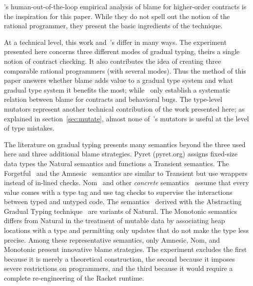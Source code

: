 
\citet{lksfd-popl-2020}'s human-out-of-the-loop empirical analysis of blame for
higher-order contracts is the inspiration for this paper.  While they do not
spell out the notion of the rational programmer, they present the basic
ingredients of the technique.

At a technical level, this work and~\citet{lksfd-popl-2020}'s differ in
many ways. The experiment presented here concerns three different modes of
gradual typing, theirs a single notion of contract checking.  It also
contributes the idea of creating three comparable rational programmers
(with several modes). Thus the method of this paper answers whether blame
adds value to a gradual type system and what gradual type system it
benefits the most; while~\citet{lksfd-popl-2020} only establish a
systematic relation between blame for contracts and behavioral bugs. The
type-level mutators represent another technical contribution of the work
presented here; as explained in section~\ref{sec:mutate}, almost none
of~\citet{lksfd-popl-2020}'s mutators is useful at the level of type
mistakes.

The literature on gradual typing presents many semantics beyond the three used
here and three additional blame strategies.  Pyret (pyret.org) assigns fixed-size
data types the Natural semantics and functions a Transient semantics. The
Forgetful~\citep{cl-icfp-2017} and the Amnesic~\citep{gfd-oopsla-2019} semantics
are similar to Transient but use wrappers instead of in-lined checks.
Nom~\citep{mt-oopsla-2017} and other \emph{concrete\/}
semantics~\citep{wnlov-popl-2010, rsfbv-popl-2015, rzv-ecoop-2015,
rat-oopsla-2017} assume that every value comes with a type tag and use tag
checks to supervise the interactions between typed and untyped code.  The semantics~\citep{tlt-popl-2019,
etg-icfp-19, tt-scp-20, tgt-popl-18, tt-sas-17} derived with the Abstracting
Gradual Typing technique~\citep{gct-popl-2016} are variants of Natural.
The Monotonic semantics~\citep{svctg-esop-2015, rsfbv-popl-2015, sfrbcsb-popl-2014, kas-pldi-2019} 
differs from Natural in the treatment of mutable data by
associating heap locations with a type and permitting only updates that 
do not make the type less precise.  
Among these representative semantics, only Amnesic, Nom, and Monotonic present innovative blame
strategies.  The experiment excludes the first because it is
merely a theoretical construction, the second because it imposes severe restrictions on
programmers, and the third because it would require a complete
re-engineering of the Racket runtime. 
